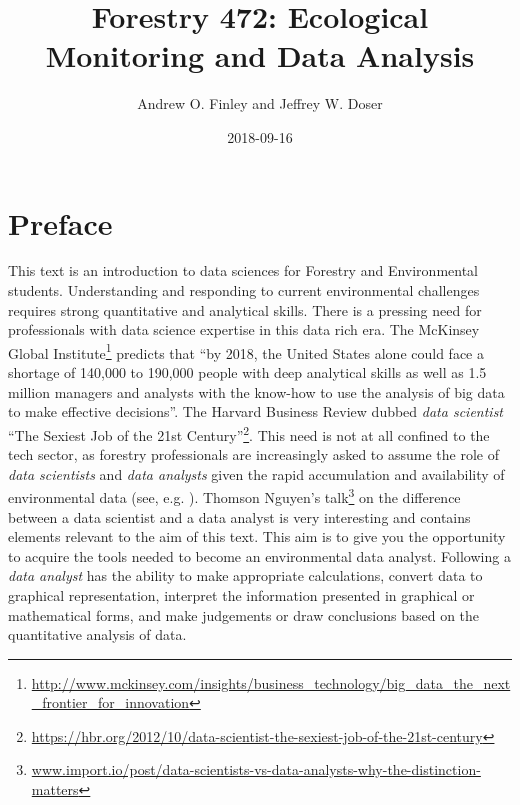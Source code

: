 \documentclass[]{krantz}
\title{Forestry 472: Ecological Monitoring and Data Analysis}
\author{Andrew O. Finley and Jeffrey W. Doser}
\date{2018-09-16}
\renewcommand{\href}[2]{#2\footnote{\url{#1}}}
\theoremstyle{definition}
\theoremstyle{definition}
\theoremstyle{definition}
\theoremstyle{remark}
\begin{document}
\maketitle


\thispagestyle{empty}

\setlength{\abovedisplayskip}{-5pt}
\setlength{\abovedisplayshortskip}{-5pt}

\mainmatter

{
\hypersetup{linkcolor=black}
\setcounter{tocdepth}{2}
\tableofcontents
}
\listoftables
\listoffigures
\chapter*{Preface}\label{preface}


This text is an introduction to data sciences for Forestry and
Environmental students. Understanding and responding to current
environmental challenges requires strong quantitative and analytical
skills. There is a pressing need for professionals with data science
expertise in this data rich era. The
\href{http://www.mckinsey.com/insights/business_technology/big_data_the_next_frontier_for_innovation}{McKinsey
Global Institute} predicts that ``by 2018, the United States alone could
face a shortage of 140,000 to 190,000 people with deep analytical skills
as well as 1.5 million managers and analysts with the know-how to use
the analysis of big data to make effective decisions''. The Harvard
Business Review dubbed \emph{data scientist}
\href{https://hbr.org/2012/10/data-scientist-the-sexiest-job-of-the-21st-century}{``The
Sexiest Job of the 21st Century''}. This need is not at all confined to
the tech sector, as forestry professionals are increasingly asked to
assume the role of \emph{data scientists} and \emph{data analysts} given
the rapid accumulation and availability of environmental data (see, e.g.
\citet{Schimel2015}).
\href{www.import.io/post/data-scientists-vs-data-analysts-why-the-distinction-matters}{Thomson
Nguyen's talk} on the difference between a data scientist and a data
analyst is very interesting and contains elements relevant to the aim of
this text. This aim is to give you the opportunity to acquire the tools
needed to become an environmental data analyst. Following
\citet{Bravo16} a \emph{data analyst} has the ability to make
appropriate calculations, convert data to graphical representation,
interpret the information presented in graphical or mathematical forms,
and make judgements or draw conclusions based on the quantitative
analysis of data.
\end{document}
